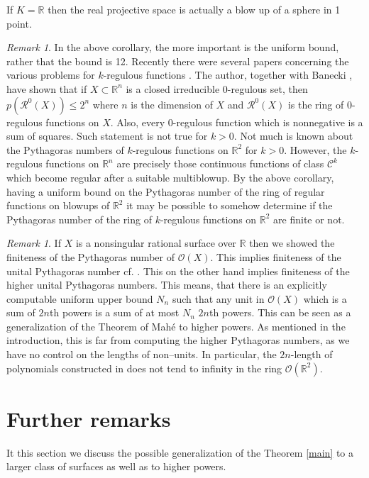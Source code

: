 \documentclass[12pt,reqno]{amsart}   	%
\theoremstyle{obs}
\theoremstyle{prob}
\theoremstyle{conj}
\theoremstyle{remark}
\newtheorem{remark}[thm]{Remark}
\newcommand{\RR}{\mathcal{R}}
\newcommand{\R}{\mathbb{R}}
\newcommand{\OO}{\mathcal{O}}
\begin{document}
If $K=\R$ then the real projective space is actually a blow up of a sphere in 1 point. 
\begin{remark}
In the above corollary, the more important is the uniform bound, rather that the bound is 12. Recently there were several papers concerning the various problems for $k$-regulous functions \cite{banecki2025, bk2023}. The author, together with Banecki \cite{bk2023}, have shown that if $X\subset \R^n$ is a closed irreducible $0$-regulous set, then $p(\RR^0(X))\leq 2^n$ where $n$ is the dimension of $X$ and $\RR^0(X)$ is the ring of $0$-regulous functions on $X$. Also, every $0$-regulous function which is nonnegative is a sum of squares. Such statement is not true for $k>0$. Not much is known about the Pythagoras numbers of $k$-regulous functions on $\R^2$ for $k>0$. However, the $k$-regulous functions on $\R^n$ are precisely those continuous functions of class $\mathcal{C}^k$ which become regular after a suitable multiblowup. By the above corollary, having a uniform bound on the Pythagoras number of the ring of regular functions on blowups of $\R^2$ it may be possible to somehow determine if the Pythagoras number of the ring of $k$-regulous functions on $\R^2$ are finite or not.
\end{remark}

\begin{remark}
If $X$ is a nonsingular rational surface over $\R$ then we showed the finiteness of the Pythagoras number of $\OO(X)$. This implies finiteness of the unital Pythagoras number cf. \cite[Theorem 5.17]{bp1996}. This on the other hand implies finiteness of the higher unital Pythagoras numbers. This means, that there is an explicitly computable uniform upper bound $N_n$ such that any unit in $\OO(X)$ which is a sum of $2n$th powers is a sum of at most $N_n$ $2n$th powers. This can be seen as a generalization of the Theorem of Mah\'e \cite[Theorem 7.3]{mahe1990} to higher powers. As mentioned in the introduction, this is far from computing the higher Pythagoras numbers, as we have no control on the lengths of non--units. In particular, the  $2n$-length of polynomials constructed in \cite{kv2023} does not tend to infinity in the ring $\OO(\R^2)$.

\end{remark}



\section{Further remarks}
It this section we discuss the possible generalization of the Theorem \ref{main} to a larger class of surfaces as well as to higher powers.
\end{document}
